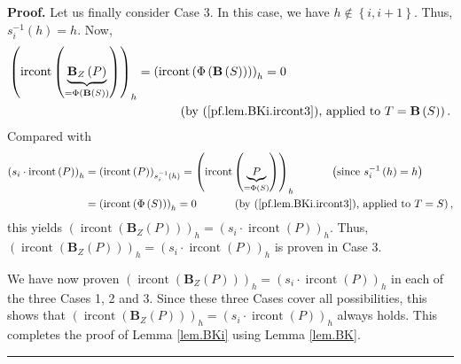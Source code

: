 \documentclass[numbers=enddot,12pt,final,onecolumn,notitlepage]{scrartcl}%
\theoremstyle{definition}
\newenvironment{proof}[1][Proof]{\noindent\textbf{#1.} }{\ \rule{0.5em}{0.5em}}
\newenvironment{verlong}{}{}
\begin{document}
\begin{verlong}
\begin{proof}
Let us finally consider Case 3. In this case, we have $h\notin\left\{
i,i+1\right\}  $. Thus, $s_{i}^{-1}\left(  h\right)  =h$. Now,%
\begin{align*}
\left(  \operatorname*{ircont}\left(  \underbrace{\mathbf{B}_{Z}\left(
P\right)  }_{=\Phi\left(  \mathbf{B}\left(  S\right)  \right)  }\right)
\right)  _{h}  &  =\left(  \operatorname*{ircont}\left(  \Phi\left(
\mathbf{B}\left(  S\right)  \right)  \right)  \right)  _{h}=0\\
&  \ \ \ \ \ \ \ \ \ \ \left(  \text{by (\ref{pf.lem.BKi.ircont3}), applied to
}T=\mathbf{B}\left(  S\right)  \right)  .
\end{align*}
Compared with%
\begin{align*}
\left(  s_{i}\cdot\operatorname*{ircont}\left(  P\right)  \right)  _{h}  &
=\left(  \operatorname*{ircont}\left(  P\right)  \right)  _{s_{i}^{-1}\left(
h\right)  }=\left(  \operatorname*{ircont}\left(  \underbrace{P}_{=\Phi\left(
S\right)  }\right)  \right)  _{h}\ \ \ \ \ \ \ \ \ \ \left(  \text{since
}s_{i}^{-1}\left(  h\right)  =h\right) \\
&  =\left(  \operatorname*{ircont}\left(  \Phi\left(  S\right)  \right)
\right)  _{h}=0\ \ \ \ \ \ \ \ \ \ \left(  \text{by (\ref{pf.lem.BKi.ircont3}%
), applied to }T=S\right)  ,
\end{align*}
this yields $\left(  \operatorname*{ircont}\left(  \mathbf{B}_{Z}\left(
P\right)  \right)  \right)  _{h}=\left(  s_{i}\cdot\operatorname*{ircont}%
\left(  P\right)  \right)  _{h}$. Thus, $\left(  \operatorname*{ircont}\left(
\mathbf{B}_{Z}\left(  P\right)  \right)  \right)  _{h}=\left(  s_{i}%
\cdot\operatorname*{ircont}\left(  P\right)  \right)  _{h}$ is proven in Case 3.

We have now proven $\left(  \operatorname*{ircont}\left(  \mathbf{B}%
_{Z}\left(  P\right)  \right)  \right)  _{h}=\left(  s_{i}\cdot
\operatorname*{ircont}\left(  P\right)  \right)  _{h}$ in each of the three
Cases 1, 2 and 3. Since these three Cases cover all possibilities, this shows
that $\left(  \operatorname*{ircont}\left(  \mathbf{B}_{Z}\left(  P\right)
\right)  \right)  _{h}=\left(  s_{i}\cdot\operatorname*{ircont}\left(
P\right)  \right)  _{h}$ always holds. This completes the proof of Lemma
\ref{lem.BKi} using Lemma \ref{lem.BK}.
\end{proof}
\end{verlong}
\end{document}
